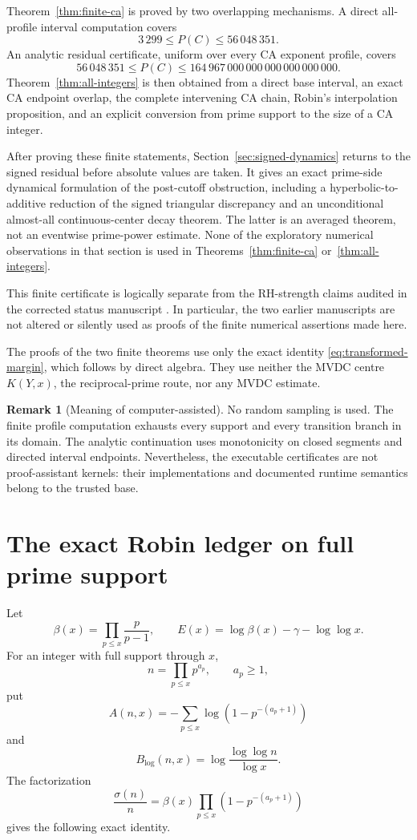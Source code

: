 \documentclass[11pt,a4paper]{article}
\numberwithin{equation}{section}
\theoremstyle{definition}
\newtheorem{remark}[theorem]{Remark}
\newcommand{\Xmin}{3\,299}
\newcommand{\Xdirect}{56\,048\,351}
\newcommand{\Xmax}{164\,967\,000\,000\,000\,000\,000\,000}
\begin{document}
Theorem~\ref{thm:finite-ca} is proved by two overlapping mechanisms.  A direct
all-profile interval computation covers
\[
  \Xmin\le P(C)\le\Xdirect.
\]
An analytic residual certificate, uniform over every CA exponent profile,
covers
\[
  \Xdirect\le P(C)\le\Xmax.
\]
Theorem~\ref{thm:all-integers} is then obtained from a direct base interval,
an exact CA endpoint overlap, the complete intervening CA chain, Robin's
interpolation proposition, and an explicit conversion from prime support to
the size of a CA integer.

After proving these finite statements, Section~\ref{sec:signed-dynamics}
returns to the signed residual before absolute values are taken.  It gives an
exact prime-side dynamical formulation of the post-cutoff obstruction,
including a hyperbolic-to-additive reduction of the signed triangular
discrepancy and an unconditional almost-all continuous-center decay theorem.
The latter is an averaged theorem, not an eventwise prime-power estimate.
None of the exploratory numerical observations in that section is used in
Theorems~\ref{thm:finite-ca} or~\ref{thm:all-integers}.

This finite certificate is logically separate from the RH-strength claims
audited in the corrected status manuscript \cite{polakstatus2026}.  In
particular, the two earlier manuscripts are not altered or silently used as
proofs of the finite numerical assertions made here.

The proofs of the two finite theorems use only the exact identity
\eqref{eq:transformed-margin}, which follows by direct algebra.  They use
neither the MVDC centre \(K(Y,x)\), the reciprocal-prime route, nor any MVDC
estimate.

\begin{remark}[Meaning of computer-assisted]
No random sampling is used.  The finite profile computation exhausts every
support and every transition branch in its domain.  The analytic continuation
uses monotonicity on closed segments and directed interval endpoints.
Nevertheless, the executable certificates are not proof-assistant kernels:
their implementations and documented runtime semantics belong to the trusted
base.
\end{remark}

\section{The exact Robin ledger on full prime support}

Let
\[
  \beta(x)=\prod_{p\le x}\frac{p}{p-1},
  \qquad
  E(x)=\log\beta(x)-\gamma-\log\log x.
\]
For an integer with full support through \(x\),
\[
  n=\prod_{p\le x}p^{a_p},
  \qquad a_p\ge1,
\]
put
\[
  A(n,x)
  =
  -\sum_{p\le x}\log\left(1-p^{-(a_p+1)}\right)
\]
and
\[
  B_{\log}(n,x)
  =
  \log\frac{\log\log n}{\log x}.
\]
The factorization
\[
  \frac{\sigma(n)}n
  =
  \beta(x)\prod_{p\le x}\left(1-p^{-(a_p+1)}\right)
\]
gives the following exact identity.
\end{document}
